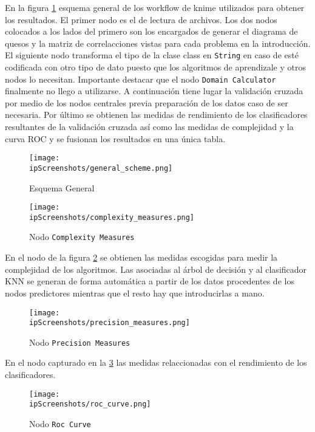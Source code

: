 \documentclass[..]{subfiles}
\begin{document}
En la figura \ref{fig:general_scheme} esquema general de los workflow de knime utilizados para obtener los resultados. El primer nodo es el de lectura de archivos. Los dos nodos colocados a los lados del primero son los encargados de generar el diagrama de quesos y la matriz de correlacciones vistas para cada problema en la introducción. El siguiente nodo transforma el tipo de la clase class en \texttt{String} en caso de esté codificada con otro tipo de dato puesto que los algoritmos de aprendizale y otros nodos lo necesitan. Importante destacar que el nodo \texttt{Domain Calculator} finalmente no llego a utilizarse. A continuación tiene lugar la validación cruzada por medio de los nodos centrales previa preparación de los datos caso de ser necesaria. Por último se obtienen las medidas de rendimiento de los clasificadores resultantes de la validación cruzada así como las medidas de complejidad y la curva ROC y se fusionan los resultados en una única tabla.

\begin{figure}[h!]
	\centering
	\texttt{[image: \\ipScreenshots/general\_scheme.png]}
	\caption{Esquema General}
	\label{fig:general_scheme}
\end{figure}

\begin{figure}[h!]
	\centering
	\texttt{[image: \\ipScreenshots/complexity\_measures.png]}
	\caption{Nodo \texttt{Complexity Measures}}
	\label{fig:complexity_measures}
\end{figure}

En el nodo de la figura \ref*{fig:complexity_measures} se obtienen las medidas escogidas para medir la complejidad de los algoritmos. Las asociadas al árbol de decisión y al clasificador KNN se generan de forma automática a partir de los datos procedentes de los nodos predictores mientras que el resto hay que introducirlas a mano. 

\begin{figure}[h!]
	\centering
	\texttt{[image: \\ipScreenshots/precision\_measures.png]}
	\caption{Nodo \texttt{Precision Measures}}
	\label{fig:precision_measures}
\end{figure}

En el nodo capturado en la \ref*{fig:precision_measures} las medidas relaccionadas con el rendimiento de los clasificadores.

\begin{figure}[h!]
	\centering
	\texttt{[image: \\ipScreenshots/roc\_curve.png]}
	\caption{Nodo \texttt{Roc Curve}}
	\label{fig:roc_curve}
\end{figure}
\end{document}
